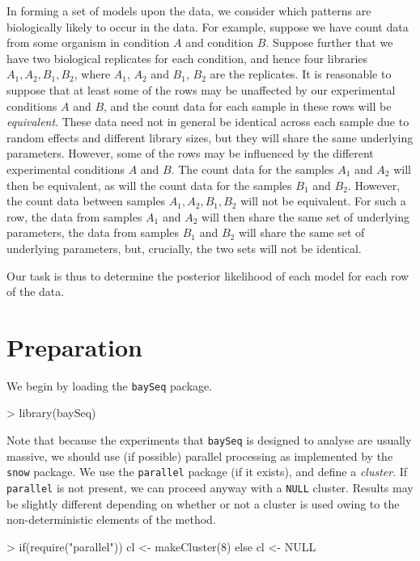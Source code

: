 \documentclass[a4paper]{article}
\begin{document}
In forming a set of models upon the data, we consider which patterns are biologically likely to occur in the data. For example, suppose we have count data from some organism in condition $A$ and condition $B$. Suppose further that we have two biological replicates for each condition, and hence four libraries $A_1, A_2, B_1, B_2$, where $A_1$, $A_2$ and $B_1$, $B_2$ are the replicates. It is reasonable to suppose that at least some of the rows may be unaffected by our experimental conditions $A$ and $B$, and the count data for each sample in these rows will be \textsl{equivalent}. These data need not in general be identical across each sample due to random effects and different library sizes, but they will share the same underlying parameters. However, some of the rows may be influenced by the different experimental conditions $A$ and $B$. The count data for the samples $A_1$ and $A_2$ will then be equivalent, as will the count data for the samples $B_1$ and $B_2$. However, the count data between samples $A_1, A_2, B_1, B_2$ will not be equivalent. For such a row, the data from samples $A_1$ and $A_2$ will then share the same set of underlying parameters, the data from samples $B_1$ and $B_2$ will share the same set of underlying parameters, but, crucially, the two sets will not be identical.

Our task is thus to determine the posterior likelihood of each model for each row of the data.

\section{Preparation}

We begin by loading the \verb'baySeq' package.



\begin{Schunk}
\begin{Sinput}
> library(baySeq)
\end{Sinput}
\end{Schunk}

Note that because the experiments that \verb'baySeq' is designed to analyse are usually massive, we should use (if possible) parallel processing as implemented by the \verb'snow' package. We use the \verb'parallel' package (if it exists), and define a \textsl{cluster}. If \verb'parallel' is not present, we can proceed anyway with a \verb'NULL' cluster. Results may be slightly different depending on whether or not a cluster is used owing to the non-deterministic elements of the method.
\begin{Schunk}
\begin{Sinput}
> if(require("parallel")) cl <- makeCluster(8) else cl <- NULL
\end{Sinput}
\end{Schunk}
\end{document}
